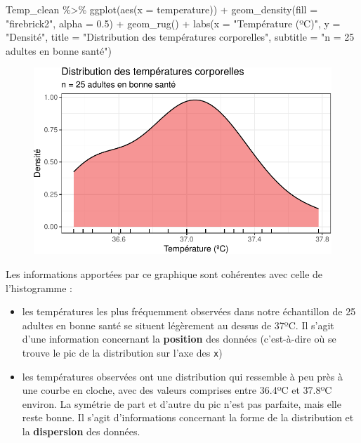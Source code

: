 \documentclass[
  a4paper,
  DIV=11,
  numbers=noendperiod,
  oneside]{scrreprt}
\newenvironment{Shaded}{}{}
\newcommand{\AttributeTok}[1]{\textcolor[rgb]{0.84,0.23,0.29}{#1}}
\newcommand{\FloatTok}[1]{\textcolor[rgb]{0.00,0.36,0.77}{#1}}
\newcommand{\FunctionTok}[1]{\textcolor[rgb]{0.44,0.26,0.76}{#1}}
\newcommand{\NormalTok}[1]{\textcolor[rgb]{0.14,0.16,0.18}{#1}}
\newcommand{\SpecialCharTok}[1]{\textcolor[rgb]{0.00,0.36,0.77}{#1}}
\newcommand{\StringTok}[1]{\textcolor[rgb]{0.01,0.18,0.38}{#1}}
\providecommand{\tightlist}{%
  \setlength{\itemsep}{0pt}\setlength{\parskip}{0pt}}\usepackage{longtable,booktabs,array}
\begin{document}
\begin{Shaded}
\begin{Highlighting}[]
\NormalTok{Temp\_clean }\SpecialCharTok{\%\textgreater{}\%}
  \FunctionTok{ggplot}\NormalTok{(}\FunctionTok{aes}\NormalTok{(}\AttributeTok{x =}\NormalTok{ temperature)) }\SpecialCharTok{+}
  \FunctionTok{geom\_density}\NormalTok{(}\AttributeTok{fill =} \StringTok{"firebrick2"}\NormalTok{, }\AttributeTok{alpha =} \FloatTok{0.5}\NormalTok{) }\SpecialCharTok{+}
  \FunctionTok{geom\_rug}\NormalTok{() }\SpecialCharTok{+}
  \FunctionTok{labs}\NormalTok{(}\AttributeTok{x =} \StringTok{"Température (ºC)"}\NormalTok{,}
       \AttributeTok{y =} \StringTok{"Densité"}\NormalTok{,}
       \AttributeTok{title =} \StringTok{"Distribution des températures corporelles"}\NormalTok{,}
       \AttributeTok{subtitle =} \StringTok{"n = 25 adultes en bonne santé"}\NormalTok{)}
\end{Highlighting}
\end{Shaded}

\begin{figure}[H]

{\centering \includegraphics{01-OneSampleTests_files/figure-pdf/unnamed-chunk-15-1.pdf}

}

\end{figure}

Les informations apportées par ce graphique sont cohérentes avec celle
de l'histogramme :

\begin{itemize}
\tightlist
\item
  les températures les plus fréquemment observées dans notre échantillon
  de 25 adultes en bonne santé se situent légèrement au dessus de 37ºC.
  Il s'agit d'une information concernant la \textbf{position} des
  données (c'est-à-dire où se trouve le pic de la distribution sur l'axe
  des \texttt{x})
\item
  les températures observées ont une distribution qui ressemble à peu
  près à une courbe en cloche, avec des valeurs comprises entre 36.4ºC
  et 37.8ºC environ. La symétrie de part et d'autre du pic n'est pas
  parfaite, mais elle reste bonne. Il s'agit d'informations concernant
  la forme de la distribution et la \textbf{dispersion} des données.
\end{itemize}
\end{document}
